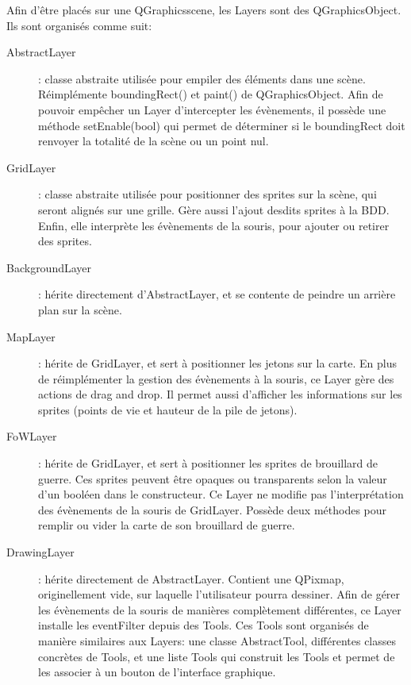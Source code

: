 Afin d'être placés sur une QGraphicsscene, les Layers sont des QGraphicsObject. Ils sont organisés comme suit:
\begin{description}
	\item[AbstractLayer]: classe abstraite utilisée pour empiler des éléments dans une scène. Réimplémente boundingRect() et paint() de QGraphicsObject. Afin de pouvoir empêcher un Layer d'intercepter les évènements, il possède une méthode setEnable(bool) qui permet de déterminer si le boundingRect doit renvoyer la totalité de la scène ou un point nul.
	\item[GridLayer]: classe abstraite utilisée pour positionner des sprites sur la scène, qui seront alignés sur une grille. Gère aussi l'ajout desdits sprites à la BDD. Enfin, elle interprète les évènements de la souris, pour ajouter ou retirer des sprites.
	\item[BackgroundLayer]: hérite directement d'AbstractLayer, et se contente de peindre un arrière plan sur la scène.
	\item[MapLayer]: hérite de GridLayer, et sert à positionner les jetons sur la carte. En plus de réimplémenter la gestion des évènements à la souris, ce Layer gère des actions de drag and drop. Il  permet aussi d'afficher les informations sur les sprites (points de vie et hauteur de la pile de jetons).
	\item[FoWLayer]: hérite de GridLayer, et sert à positionner les sprites de brouillard de guerre. Ces sprites peuvent être opaques ou transparents selon la valeur d'un booléen dans le constructeur. Ce Layer ne modifie pas l'interprétation des évènements de la souris de GridLayer. Possède deux méthodes pour remplir ou vider la carte de son brouillard de guerre. 
	\item[DrawingLayer]: hérite directement de AbstractLayer. Contient une QPixmap, originellement vide, sur laquelle l'utilisateur pourra dessiner. Afin de gérer les évènements de la souris de manières complètement différentes, ce Layer installe les eventFilter depuis des Tools. Ces Tools sont organisés de manière similaires aux Layers: une classe AbstractTool, différentes classes concrètes de Tools, et une liste Tools qui construit les Tools et permet de les associer à un bouton de l'interface graphique.
\end{description}